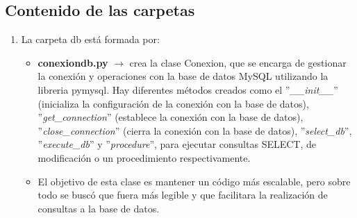 \documentclass[10pt]{book}
\begin{document}
\subsection{Contenido de las carpetas}
    \begin{enumerate}
        \item La carpeta db está formada por:
            \begin{itemize}
                \item \textbf{conexiondb.py} $\rightarrow$ crea la clase Conexion, que se encarga de gestionar la conexión y operaciones con la base de datos MySQL utilizando la libreria pymysql. Hay diferentes métodos creados como el ''\textit{\_\_init\_\_}'' (inicializa la configuración de la conexión con la base de datos), ''\textit{get\_connection}'' (establece la conexión con la base de datos), ''\textit{close\_connection}'' (cierra la conexión con la base de datos), ''\textit{select\_db}'', ''\textit{execute\_db}'' y ''\textit{procedure}'', para ejecutar consultas SELECT, de modificación o un procedimiento respectivamente.
                \item El objetivo de esta clase es mantener un código más escalable, pero sobre todo se buscó que fuera más legible y que facilitara la realización de consultas a la base de datos.
            \end{itemize}


\end{enumerate}
\end{document}
